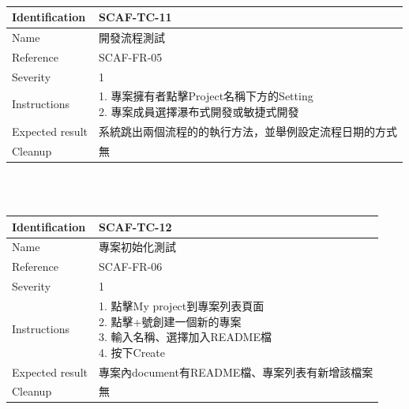 \documentclass{report}
\begin{document}
\newline
\\
\begin{tabularx}{\textwidth}{
  |p{}%
  |p{}|%
  }
  \hline
  \centering Identification &  SCAF-TC-11 \\
  \hline
  \centering Name & 開發流程測試 \\
  \hline
  \centering Reference & SCAF-FR-05 \\
  \hline
  \centering Severity & 1 \\
  \hline
  \centering Instructions & 
  \makecell[l]{
    1. 專案擁有者點擊Project名稱下方的Setting \\
    2. 專案成員選擇瀑布式開發或敏捷式開發 \\
  }\\
  \hline
  \centering Expected result & 系統跳出兩個流程的的執行方法，並舉例設定流程日期的方式 \\
  \hline
  \centering Cleanup & 無 \\
  \hline
\end{tabularx}
\\
\newline
\\
\begin{tabularx}{\textwidth}{
  |p{}%
  |p{}|%
  }
  \hline
  \centering Identification &  SCAF-TC-12 \\
  \hline
  \centering Name & 專案初始化測試 \\
  \hline
  \centering Reference & SCAF-FR-06 \\
  \hline
  \centering Severity & 1 \\
  \hline
  \centering Instructions & 
  \makecell[l]{
    1. 點擊My project到專案列表頁面  \\
    2. 點擊+號創建一個新的專案  \\
    3. 輸入名稱、選擇加入README檔  \\
    4. 按下Create
  }\\
  \hline
  \centering Expected result & 專案內document有README檔、專案列表有新增該檔案 \\
  \hline
  \centering Cleanup & 無 \\
  \hline
\end{tabularx}
\\
\newline
\\
\end{document}
